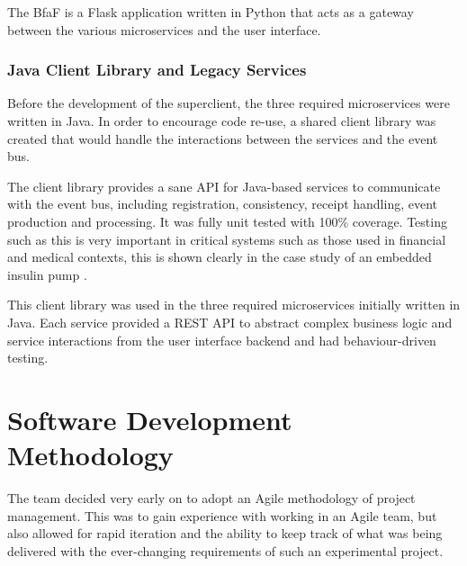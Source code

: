 \documentclass{l3proj}
\begin{document}
The BfaF is a Flask \cite{flask} application written in Python that acts as a gateway between the various microservices and the user interface.

\subsubsection{Java Client Library and Legacy Services}
Before the development of the superclient, the three required microservices were written in Java. In order to encourage code re-use, a shared client library was created that would handle the interactions between the services and the event bus.

The client library provides a sane API for Java-based services to communicate with the event bus, including registration, consistency, receipt handling, event production and processing. It was fully unit tested with 100\% coverage. Testing such as this is very important in critical systems such as those used in financial and medical contexts, this is shown clearly in the case study of an embedded insulin pump \cite{embedded-insulin-pump}.

This client library was used in the three required microservices initially written in Java. Each service provided a REST API to abstract complex business logic and service interactions from the user interface backend and had behaviour-driven testing.

\section{Software Development Methodology}
\label{sec:software-development-methodology}
The team decided very early on to adopt an Agile \cite{agile} methodology of project management. This was to gain experience with working in an Agile team, but also allowed for rapid iteration and the ability to keep track of what was being delivered with the ever-changing requirements of such an experimental project.
\end{document}
